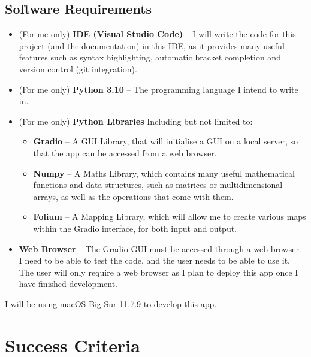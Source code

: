 \documentclass[12pt]{report}
\begin{document}
\subsection{Software Requirements}
\begin{itemize}
    \item (For me only) \textbf{IDE (Visual Studio Code)} -- I will write the code for this project (and the documentation) in this IDE, as it provides many useful features such as syntax highlighting, automatic bracket completion and version control (git integration).
    \item (For me only) \textbf{Python 3.10} -- The programming language I intend to write in.
    \item (For me only) \textbf{Python Libraries} Including but not limited to:
    \begin{itemize}
        \item \textbf{Gradio} -- A GUI Library, that will initialise a GUI on a local server, so that the app can be accessed from a web browser.
        \item \textbf{Numpy} -- A Maths Library, which contains many useful mathematical functions and data structures, such as matrices or multidimensional arrays, as well as the operations that come with them.
        \item \textbf{Folium} -- A Mapping Library, which will allow me to create various maps within the Gradio interface, for both input and output.
    \end{itemize}
    \item \textbf{Web Browser} -- The Gradio GUI must be accessed through a web browser. I need to be able to test the code, and the user needs to be able to use it. The user will only require a web browser as I plan to deploy this app once I have finished development.
\end{itemize}
I will be using macOS Big Sur 11.7.9 to develop this app.

\section{Success Criteria}
\begin{center}
\end{center}
\end{document}
